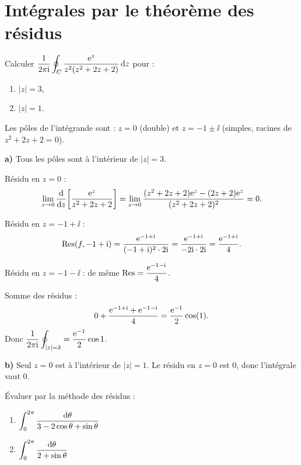 \documentclass[12pt,a4paper]{article}
\begin{document}
\section{Intégrales par le théorème des résidus}

\begin{boiteexercice}
\niveau{\difficile}
Calculer $\displaystyle\frac{1}{2\pi\mathrm{i}}\oint_C\frac{\mathrm{e}^z}{z^2(z^2+2z+2)}\,\mathrm{d} z$ pour :
\begin{enumerate}[label=\alph*)]
  \item $|z|=3$,
  \item $|z|=1$.
\end{enumerate}
\end{boiteexercice}

\begin{boitecorrige}
Les pôles de l'intégrande sont : $z=0$ (double) et $z=-1\pm\ii$ (simples, racines de $z^2+2z+2=0$).

\textbf{a)} Tous les pôles sont à l'intérieur de $|z|=3$.

Résidu en $z=0$ :
\[
\lim_{z\to 0}\frac{\mathrm{d}}{\mathrm{d} z}\!\left[\frac{\mathrm{e}^z}{z^2+2z+2}\right]
= \lim_{z\to 0}\frac{(z^2+2z+2)\mathrm{e}^z - (2z+2)\mathrm{e}^z}{(z^2+2z+2)^2} = 0.
\]

Résidu en $z=-1+\ii$ :
\[
\operatorname{Res}\!\left(f,-1+\mathrm{i}\right) = \frac{\mathrm{e}^{-1+\mathrm{i}}}{(-1+\mathrm{i})^2\cdot 2\mathrm{i}} = \frac{\mathrm{e}^{-1+\mathrm{i}}}{-2\mathrm{i}\cdot 2\mathrm{i}} = \frac{\mathrm{e}^{-1+\mathrm{i}}}{4}.
\]

Résidu en $z=-1-\ii$ : de même $\operatorname{Res} = \dfrac{\mathrm{e}^{-1-\mathrm{i}}}{4}$.

Somme des résidus :
\[
0 + \frac{\mathrm{e}^{-1+\mathrm{i}}+\mathrm{e}^{-1-\mathrm{i}}}{4} = \frac{\mathrm{e}^{-1}}{2}\cos(1).
\]
Donc $\displaystyle\frac{1}{2\pi\mathrm{i}}\oint_{|z|=3} = \frac{\mathrm{e}^{-1}}{2}\cos 1$.

\textbf{b)} Seul $z=0$ est à l'intérieur de $|z|=1$. Le résidu en $z=0$ est $0$, donc l'intégrale vaut $0$.
\end{boitecorrige}

\begin{boiteexercice}
\niveau{\difficile}
Évaluer par la méthode des résidus :
\begin{enumerate}[label=\alph*)]
  \item $\displaystyle\int_0^{2\pi}\frac{\mathrm{d}\theta}{3-2\cos\theta+\sin\theta}$
  \item $\displaystyle\int_0^{2\pi}\frac{\mathrm{d}\theta}{2+\sin\theta}$
\end{enumerate}
\end{boiteexercice}
\end{document}
